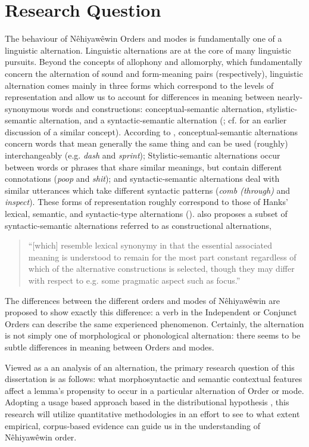 \chapter{Research Question}
\label{ch:rq}
\doublespace
The behaviour of Nêhiyawêwin Orders and modes is fundamentally one of a linguistic alternation. Linguistic alternations are at the core of many linguistic pursuits. Beyond the concepts of allophony and allomorphy, which fundamentally concern the alternation of sound and form-meaning pairs (respectively),  linguistic alternation comes mainly in three forms which correspond to the levels of representation and allow us to account for differences in meaning between nearly-synonymous words and constructions: conceptual-semantic alternation, stylistic-semantic alternation, and a syntactic-semantic alternation (\citealt[8]{arppe2008univariate};  cf. \citealt{edmonds2002near} for an earlier discussion of a similar concept). According to \citet[8]{arppe2008univariate}, conceptual-semantic alternations concern words that mean generally the same thing and can be used (roughly) interchangeably (e.g. \textit{dash} and \textit{sprint}); Stylistic-semantic alternations occur between words or phrases that share similar meanings, but contain different connotations (\textit{poop} and \textit{shit}); and syntactic-semantic alternations deal with similar utterances which take different syntactic patterns (\textit{comb (through)} and \textit{inspect}). These forms of representation roughly correspond to those of Hanks’ lexical, semantic, and syntactic-type alternations (\citeyear[173]{hanks2013lexical}). \citet[10]{arppe2008univariate} also proposes a subset of syntactic-semantic alternations  referred to as constructional alternations,

\begin{quote}
    ``[which] resemble lexical synonymy in that the essential associated meaning is understood to remain for the most part constant regardless of which of the alternative constructions is selected, though they may differ with respect to e.g. some pragmatic aspect such as focus.” 
    \end{quote}
    
    The differences between the different orders and modes of Nêhiyawêwin are proposed to show exactly this difference: a verb in the Independent or Conjunct Orders can describe the same experienced phenomenon. Certainly, the alternation is not simply one of morphological or phonological alternation: there seems to be subtle differences in meaning between Orders and modes.

Viewed as a an analysis of an alternation, the primary research question of this dissertation is as follows: what morphosyntactic and semantic contextual features affect a lemma’s propensity to occur in a particular alternation of Order or mode. Adopting a usage based approach based in the distributional hypothesis \citep{harris1954distributional, firth1957synopsis}, this research will utilize quantitative methodologies in an effort to see to what extent empirical, corpus-based evidence can guide us in the understanding of Nêhiyawêwin order. 
